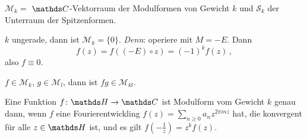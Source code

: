 \begin{nota}
$\mathcal{M}_k =$ $\CC$-Vektorraum der Modulformen von Gewicht $k$ und $\mathcal{S}_k$ der Unterraum der Spitzenformen.
\end{nota}

\begin{beme-list}
\item $k$ ungerade, dann ist $\mathcal{M}_k = \{0\}$.
\emph{Denn}: operiere mit $M = -E$. Dann
\[
    f(z) = f((-E) \circ z) = (-1)^k f(z)
    \,,
\]
also $f \equiv 0$.
\item $f \in \mathcal{M}_k$, $g\in \mathcal{M}_l$, dann ist $fg \in \mathcal{M}_{kl}$.
\item Eine Funktion $f\colon \HH \ra \CC$ ist Modulform vom Gewicht $k$ genau dann, wenn $f$ eine Fourierentwickling $f(z) = \sum_{n\geq 0} a_nz^{2\pi inz}$ hat, die konvergent für alle $z\in \HH$ ist, und es gilt $f(-\frac{1}{z}) = z^kf(z)$.
\end{beme-list}